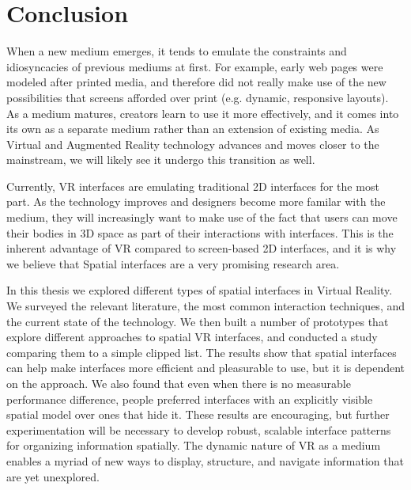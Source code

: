 \documentclass[nobib]{tufte-book} %
\begin{document}

\chapter{Conclusion}
\label{ch:conclusion}

When a new medium emerges, it tends to emulate the constraints and idiosyncacies of previous mediums at first. For example, early web pages were modeled after printed media, and therefore did not really make use of the new possibilities that screens afforded over print (e.g. dynamic, responsive layouts). As a medium matures, creators learn to use it more effectively, and it comes into its own as a separate medium rather than an extension of existing media. As Virtual and Augmented Reality technology advances and moves closer to the mainstream, we will likely see it undergo this transition as well.

Currently, VR interfaces are emulating traditional 2D interfaces for the most part. As the technology improves and designers become more familar with the medium, they will increasingly want to make use of the fact that users can move their bodies in 3D space as part of their interactions with interfaces. This is the inherent advantage of VR compared to screen-based 2D interfaces, and it is why we believe that Spatial interfaces are a very promising research area.

In this thesis we explored different types of spatial interfaces in Virtual Reality. We surveyed the relevant literature, the most common interaction techniques, and the current state of the technology. We then built a number of prototypes that explore different approaches to spatial VR interfaces, and conducted a study comparing them to a simple clipped list. The results show that spatial interfaces can help make interfaces more efficient and pleasurable to use, but it is dependent on the approach. We also found that even when there is no measurable performance difference, people preferred interfaces with an explicitly visible spatial model over ones that hide it. These results are encouraging, but further experimentation will be necessary to develop robust, scalable interface patterns for organizing information spatially. The dynamic nature of VR as a medium enables a myriad of new ways to display, structure, and navigate information that are yet unexplored.
\end{document}
